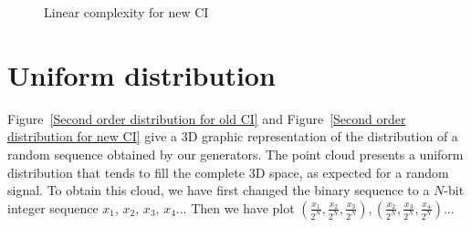 \begin{figure}
{} \hspace{0.5cm}
\caption{Linear complexity for new CI}
\label{Linear complexity for new CI}
\end{figure}


\section{Uniform distribution}

Figure~\ref{Second order distribution for old CI} and Figure~\ref{Second order distribution for new CI} give a 3D graphic representation of the distribution of a random sequence obtained by our generators. The point cloud presents a uniform distribution that tends to fill the complete 3D space, as expected for a random signal. To obtain this cloud, we have first changed the binary sequence to a $N$-bit integer sequence $x_1$, $x_2$, $x_3$, $x_4$... Then we have plot $\left(\frac{x_1}{2^N},\frac{x_2}{2^N},\frac{x_3}{2^N}\right), \left(\frac{x_2}{2^N},\frac{x_3}{2^N},\frac{x_4}{2^N}\right)$...

